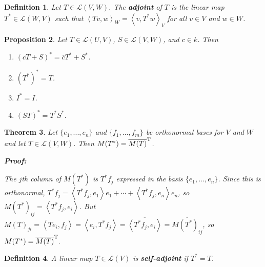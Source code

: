 \documentclass{article}
\theoremstyle{colontheorem}
\newtheorem{theorem}{Theorem}[section]
\newtheorem{proposition}[theorem]{Proposition}
\newtheorem{definition}[theorem]{Definition}
\newenvironment{Theorem}
{
	\begin{mdframed}[backgroundcolor=TheoremOrange!10]
	\begin{theorem}
}
{
	\end{theorem}
	\end{mdframed}
	
	\vspace{.15in}
}
\newenvironment{Proposition}
{
	\begin{mdframed}[backgroundcolor=TheoremOrange!10]
	\begin{proposition}
}
{
	\end{proposition}
	\end{mdframed}
	
	\vspace{.15in}
}
\newenvironment{Def}
{
	\begin{mdframed}[backgroundcolor=DefGreen!10]
	\begin{definition}
}
{
	\end{definition}
	\end{mdframed}
	
	\vspace{.15in}
}
\newenvironment{Proof}
{
	\begin{mdframed}[backgroundcolor=ProofPurple!10]
	\textbf{Proof:}%
}
{
	\end{mdframed}
	
	\vspace{.085in}
}
\begin{document}
\begin{Def}
	
	Let $T \in \mathcal{L}(V, W)$. The \textbf{adjoint} of $T$ is the linear map $T^* \in \mathcal{L}(W, V)$ such that $\left< Tv, w \right>_W = \left< v, T^*w \right>_V$ for all $v \in V$ and $w \in W$.
	
\end{Def}



\begin{Proposition}
	
	Let $T \in \mathcal{L}(U, V)$, $S \in \mathcal{L}(V, W)$, and $c \in k$. Then
	
	\begin{enumerate}
		
		\item $(cT + S)^* = \overline{c} T^* + S^*$.
		
		\item $(T^*)^* = T$.
		
		\item $I^* = I$.
		
		\item $(ST)^* = T^* S^*$.
		
	\end{enumerate}
	
\end{Proposition}



\begin{Theorem}
	
	Let $\{e_1, ..., e_n\}$ and $\{f_1, ..., f_m\}$ be orthonormal bases for $V$ and $W$ and let $T \in \mathcal{L}(V, W)$. Then $M(T^*) = \overline{M(T)}^\textnormal{T}$.
	
	\begin{Proof}
		The $j$th column of $M(T^*)$ is $T^* f_j$ expressed in the basis $\{e_1, ..., e_n\}$. Since this is orthonormal, $T^* f_j = \left< T^* f_j, e_1 \right> e_1 + \cdots + \left< T^* f_j, e_n \right> e_n$, so $M(T^*)_{ij} = \left< T^* f_j, e_i \right>$. But $M(T)_{ji} = \left< Te_i, f_j \right> = \left< e_i, T^* f_j \right> = \overline{\left< T^* f_j, e_i \right>} = \overline{M(T^*)_{ij}}$, so $M(T^*) = \overline{M(T)}^\textnormal{T}.$
		
	\end{Proof}
	
\end{Theorem}



\begin{Def}
	
	A linear map $T \in \mathcal{L}(V)$ is \textbf{self-adjoint} if $T^* = T$.
	
\end{Def}
\end{document}
